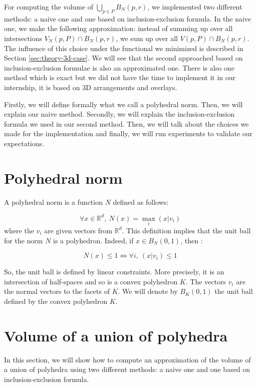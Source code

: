 For computing the volume of $ \bigcup_{p \in P} B_N(p, r) $, we implemented two
different methods: a naive one and one based on inclusion-exclusion formula.  In
the naive one, we make the following approximation: instead of summing up over
all intersections $ V_N(p, P) \cap B_N(p, r) $, we sum up over all $ V(p, P)
\cap B_N(p, r) $. The influence of this choice under the functional we minimized
is described in Section \ref{sec:theory-3d-case}. We will see that the second
approached based on inclusion-exclusion formulae is also an approximated one.
There is also one method which is exact but we did not have the time to
implement it in our internship, it is based on 3D arrangements and overlays.

Firstly, we will define formally what we call a polyhedral norm. Then, we will
explain our naive method. Secondly, we will explain the inclusion-exclusion
formula we used in our second method. Then, we will talk about the choices we
made for the implementation and finally, we will run experiments to validate our
expectations.

\section{Polyhedral norm}
\label{sec:polyhedral-norm}
A polyhedral norm is a function $ N $ defined as follows:

\begin{equation}
    \forall x \in \mathbb{R}^d,~ N(x) = \max_{i} (x | v_i)
\end{equation}
where the $ v_i $ are given vectors from $ \mathbb{R}^d $. This definition
implies that the unit ball for the norm $ N $ is a polyhedron. Indeed, if $ x
\in B_N(0, 1) $, then :

$$ N(x) \leq 1 \Longleftrightarrow \forall i,~(x | v_i) \leq 1 $$

So, the unit ball is defined by linear constraints. More precisely, it is an
intersection of half-spaces and so is a convex polyhedron $ K $. The vectors $
v_i $ are the normal vectors to the facets of $ K $. We will denote by $ B_K(0,
1) $ the unit ball defined by the convex polyhedron $ K $.

\section{Volume of a union of polyhedra}

In this section, we will show how to compute an approximation of the volume of
a union of polyhedra using two different methods: a naive one and one based on
inclusion-exclusion formula.

